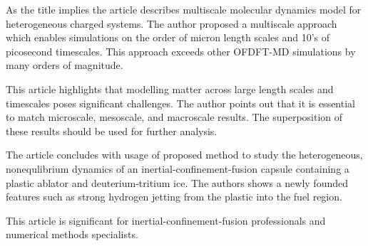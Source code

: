 \documentclass[main.tex]{subfiles}
\begin{document}
\setcounter{secnumdepth}{0}


\setcounter{section}{103}


\setcounter{subsection}{1}
As the title implies the article describes multiscale molecular dynamics model for heterogeneous charged systems.
The author proposed a multiscale approach which enables simulations on the order of micron length scales and 10's of picosecond timescales.
This approach exceeds other OFDFT-MD simulations by many orders of magnitude.\par
This article highlights that modelling matter across large length scales and timescales poses significant challenges.
The author points out that it is essential to match microscale, mesoscale, and macroscale results.
The superposition of these results should be used for further analysis.\par
The article concludes with usage of proposed method to study the heterogeneous, nonequlibrium dynamics of an inertial-confinement-fusion capsule containing a plastic ablator and deuterium-tritium ice.
The authors shows a newly founded features such as strong hydrogen jetting from the plastic into the fuel region.\par
This article is significant for inertial-confinement-fusion professionals and numerical methods specialists.
\ \\\\
\newpage
\end{document}
